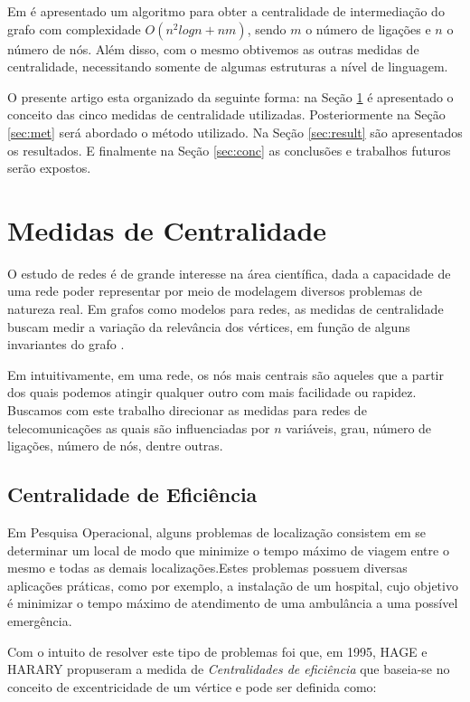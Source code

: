 \documentclass[12pt]{article}
\begin{document}
Em \cite{Brandes01afaster} é apresentado um algoritmo para obter a centralidade de intermediação do grafo com complexidade  $O(n^2 log n+nm)$, sendo $m$ o número de ligações e $n$ o número de nós.
Além disso, com o mesmo obtivemos as outras medidas de centralidade, necessitando somente de algumas estruturas a nível de linguagem.

O presente artigo esta organizado da seguinte forma: na Seção \ref{sec:mc} é apresentado o conceito das cinco medidas de centralidade utilizadas.
Posteriormente na  Seção \ref{sec:met} será abordado o método utilizado. 
Na Seção \ref{sec:result} são apresentados os resultados.
E finalmente na Seção \ref{sec:conc} as conclusões e trabalhos futuros serão expostos. 




\section{Medidas de Centralidade}\label{sec:mc}

O estudo de redes é de grande interesse na área científica, dada a capacidade de uma rede poder representar por meio de modelagem diversos problemas de natureza real.
Em grafos como modelos para redes, as medidas de centralidade buscam medir a variação da relevância dos vértices, em função de alguns invariantes do grafo \cite{freitas}.

Em \cite{freitas} intuitivamente, em uma rede, os nós mais centrais são aqueles que a partir dos quais podemos atingir qualquer outro com mais facilidade ou rapidez. Buscamos com este trabalho direcionar as medidas para redes de telecomunicações as quais são influenciadas por $n$ variáveis, grau, número de ligações, número de nós, dentre outras.




\subsection{Centralidade de Eficiência}
Em  Pesquisa  Operacional,  alguns  problemas  de  localização  consistem  em  se determinar um local de modo que minimize o tempo máximo de viagem entre o mesmo e todas as demais localizações.Estes problemas possuem diversas aplicações práticas, como  por  exemplo,  a  instalação  de  um  hospital,  cujo objetivo  é  minimizar  o  tempo máximo de atendimento de uma ambulância a uma possível emergência\cite{freitas}.

Com o intuito de resolver este tipo de problemas foi que, em 1995,  HAGE e HARARY propuseram a medida de {\it Centralidades de eficiência} que baseia-se no conceito de excentricidade de um vértice e pode ser definida como: 
\end{document}
